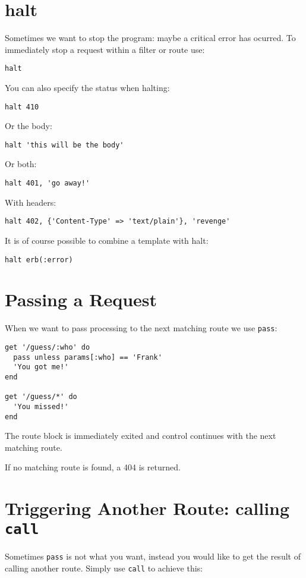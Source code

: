 \section{halt}

Sometimes we want to stop the program: maybe a critical error has ocurred.
To immediately stop a request within a filter or route use:

\begin{verbatim}
halt
\end{verbatim}
You can also specify the status when halting:

\begin{verbatim}
halt 410
\end{verbatim}
Or the body:

\begin{verbatim}
halt 'this will be the body'
\end{verbatim}
Or both:

\begin{verbatim}
halt 401, 'go away!'
\end{verbatim}
With headers:

\begin{verbatim}
halt 402, {'Content-Type' => 'text/plain'}, 'revenge'
\end{verbatim}
It is of course possible to combine a template with halt:

\begin{verbatim}
halt erb(:error)
\end{verbatim}

\section{Passing a Request}
When we want to pass processing 
to the next matching route we use
\verb|pass|:

\begin{verbatim}
get '/guess/:who' do
  pass unless params[:who] == 'Frank'
  'You got me!'
end

get '/guess/*' do
  'You missed!'
end
\end{verbatim}
The route block is immediately exited and control continues with
the next matching route. 

If no matching route is found, a 404 is
returned.

\section{Triggering Another Route: calling {\tt call}}
Sometimes \verb|pass| is not what you want, 
instead you would like to get the result of calling another route. 
Simply use \verb|call| to achieve this:

